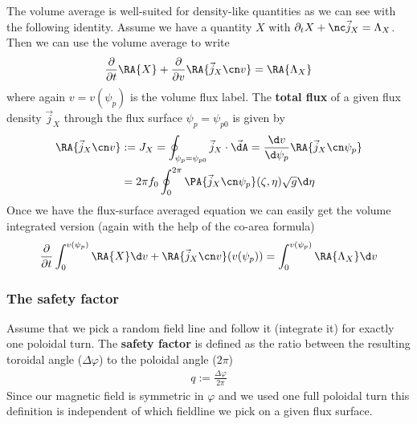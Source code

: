 The volume average is well-suited for density-like quantities
as we can see with the following identity.
Assume we have a quantity $X$ with $\partial_t X + \nc \vec j_X = \Lambda_X$.
Then we can use the volume average to write
\begin{align}
\frac{\partial}{\partial t} \RA{X } + \frac{\partial}{
  \partial v} \RA{ \vec j_X\cn v}  = \RA{ \Lambda_X}
\label{eq:fsa_balance}
\end{align}
where again $v=v(\psi_p)$ is the volume flux label.
The {\bf total flux} of a given flux density $\vec j_X$ through the
flux surface $\psi_p = \psi_{p0}$ is given by
\begin{align}
\RA{\vec j_X\cn v} &:= J_X=\oint_{\psi_p=\psi_{p0}} \vec j_X\cdot \vec{\dA} =
 \frac{\d v}{\d\psi_p} \RA{ \vec j_X\cn\psi_p }\nonumber\\
 &=
   2\pi f_0 \oint_0^{2\pi} \PA{ \vec j_X\cn\psi_p}(\zeta,\eta) \sqrt{g}\d\eta
\label{eq:total_flux}
\end{align}
Once we have the flux-surface averaged equation we can easily get the volume integrated version (again with the help of the co-area formula)
\begin{align}
\frac{\partial}{\partial t} \int_0^{v(\psi_p)}\RA{X} \d v 
+ \RA{ \vec j_X\cn v}(v(\psi_p))  = \int_0^{v(\psi_p)}\RA{ \Lambda_X}\d v
\label{eq:integral_balance}
\end{align}

\subsubsection{The safety factor}
Assume that we pick a random field line and follow it (integrate it) for exactly one
poloidal turn. The {\bf safety factor} is defined as the ratio between
the resulting toroidal angle ($\Delta\varphi$) to the poloidal angle ($2\pi$)
\begin{align}
q := \frac{\Delta\varphi}{2\pi}
\label{}
\end{align}
Since our magnetic field is symmetric in $\varphi$ and we used one
full poloidal turn this definition is independent of which
fieldline we pick on a given flux surface.

